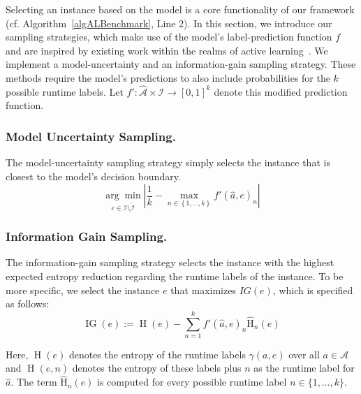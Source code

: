 \documentclass[runningheads]{llncs}
\begin{document}
Selecting an instance based on the model is a core functionality of our framework (cf. Algorithm~\ref{algALBenchmark}, Line 2).
In this section, we introduce our sampling strategies, which make use of the model's label-prediction function $f$ and are inspired by existing work within the realms of active learning~\cite{settles2009active}.
We implement a model-uncertainty and an information-gain sampling strategy.
These methods require the model's predictions to also include probabilities for the $k$ possible runtime labels.
Let $f' : \mathcal{\hat A} \times \mathcal{I} \rightarrow \left[0, 1\right]^k$ denote this modified prediction function.

\subsubsection{Model Uncertainty Sampling.}

The model-uncertainty sampling strategy simply selects the instance that is closest to the model's decision boundary.
%
\begin{equation*}
  \underset{e \in \mathcal{I} \setminus \tilde{\mathcal{I}}}{\arg\min} \left\lvert \frac{1}{k} - \max_{n \in \left\lbrace 1, \dots, k \right\rbrace} f'\!\left(\hat{a}, e\right)_{n} \right\rvert
\end{equation*}

\subsubsection{Information Gain Sampling.}

The information-gain sampling strategy selects the instance with the highest expected entropy reduction regarding the runtime labels of the instance.
To be more specific, we select the instance $e$ that maximizes $IG(e)$, which is specified as follows:
%
\begin{equation*}
  \operatorname{IG}(e) := \operatorname{H}(e) - \sum_{n = 1}^{k} f'(\hat{a}, e)_{n} \operatorname{\hat H}_n(e)
\end{equation*}

Here, $\operatorname{H}(e)$ denotes the entropy of the runtime labels $\gamma(a, e)$ over all $a \in \mathcal{A}$ and $\operatorname{H}(e, n)$ denotes the entropy of these labels plus $n$ as the runtime label for $\hat{a}$.
The term $\operatorname{\hat H}_n(e)$ is computed for every possible runtime label $n \in \{1, \dots, k\}$.

\end{document}
